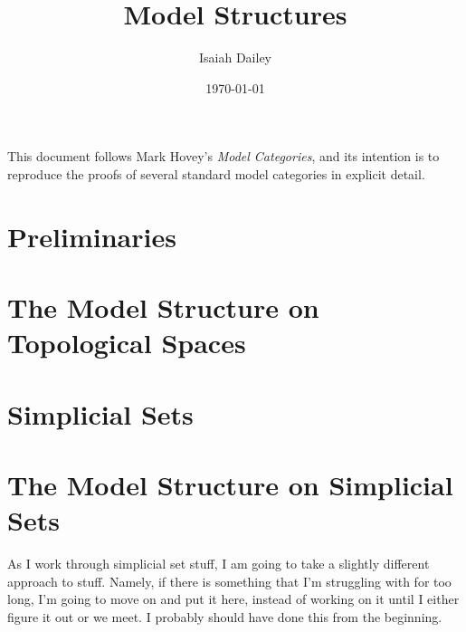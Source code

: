 \documentclass{amsart}
\title{Model Structures}
\author{Isaiah Dailey}
\date{\today}
\theoremstyle{plain}
\theoremstyle{definition}
\newcommand{\0}{\mathbf{0}}
\renewcommand{\(}{\left(}
\renewcommand{\)}{\right)}
\begin{document}
\maketitle


\tableofcontents

This document follows Mark Hovey's \textit{Model Categories}, and its intention is to reproduce the proofs of several standard model categories in explicit detail.

\section{Preliminaries}



\section{The Model Structure on Topological Spaces}



\section{Simplicial Sets}



\section{The Model Structure on Simplicial Sets}



As I work through simplicial set stuff, I am going to take a slightly different approach to stuff. Namely, if there is something that I'm struggling with for too long, I'm going to move on and put it here, instead of working on it until I either figure it out or we meet. I probably should have done this from the beginning.
\end{document}
